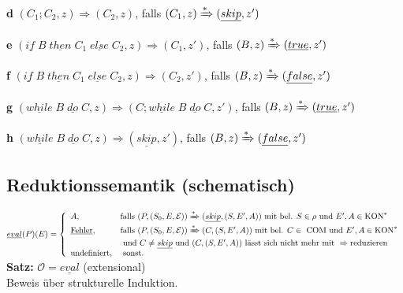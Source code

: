 \begin{enumerate}
\begin{compactitem}
		\item[\textbf{d}] $(C_1;C_2, z)\Rightarrow (C_2,z)$, falls $(C_1, z)\xRightarrow{*}(\underline{skip},z')$
		\item[\textbf{e}] $(\underline{if}\;B\;\underline{then}\;C_1\;\underline{else}\;C_2, z) \Rightarrow (C_1, z')$, falls $(B,z)\xRightarrow{*}(\underline{true}, z')$
		\item[\textbf{f}] $(\underline{if}\;B\;\underline{then}\;C_1\;\underline{else}\;C_2, z) \Rightarrow (C_2, z')$, falls $(B,z)\xRightarrow{*}(\underline{false}, z')$
		\item[\textbf{g}] $(\underline{while}\;B\;\underline{do}\;C, z) \Rightarrow (C;\underline{while}\;B\;\underline{do}\;C, z')$, falls $(B,z) \xRightarrow{*} (\underline{true}, z')$
		\item[\textbf{h}] $(\underline{while}\;B\;\underline{do}\;C, z) \Rightarrow (\underline{skip}, z')$, falls $(B,z) \xRightarrow{*} (\underline{false}, z')$
	\end{compactitem}
\end{enumerate}
\subsection{Reduktionssemantik (schematisch)}
$\underline{eval}(P)(E)=\left\lbrace\begin{array}{l l} A\text{,}&\text{falls } (P,(S_0,E,\mathcal{E}))\xRightarrow{*}(\underline{skip},(S,E',A))\text{ mit bel. } S \in \rho \text{ und } E', A \in \text{KON}^*\\
\text{\underline{Fehler}}\text{,}&\text{falls }  (P,(S_0, E, \mathcal{E}))\xRightarrow{*}(C,(S,E',A)) \text{ mit bel. } C \in \text{ COM und } E', A \in \text{KON}^*\\& \text{ und } C \neq \underline{skip} \text{ und } (C, (S, E', A))\text{ lässt sich nicht mehr mit } \Rightarrow \text{reduzieren}\\
\text{undefiniert,}&\text{ sonst.}\\
\end{array}\right.$\\
\textbf{Satz:} $\mathcal{O} = \underline{eval}$ (extensional)\\
Beweis über strukturelle Induktion.